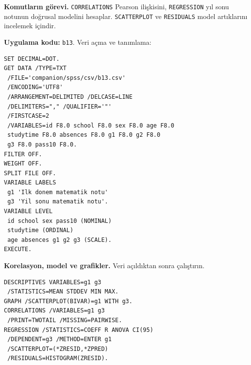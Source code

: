 {\raggedright
\noindent\textbf{Komutların görevi.} \texttt{CORRELATIONS} Pearson ilişkisini, \texttt{REGRESSION} yıl sonu notunun doğrusal modelini hesaplar. \texttt{SCATTERPLOT} ve \texttt{RESIDUALS} model artıklarını incelemek içindir.\par}

\par\noindent\begin{minipage}{\linewidth}
\textbf{Uygulama kodu:} \texttt{b13}. Veri açma ve tanımlama:

\begin{lstlisting}[style=prismSPSS]
SET DECIMAL=DOT.
GET DATA /TYPE=TXT
 /FILE='companion/spss/csv/b13.csv'
 /ENCODING='UTF8'
 /ARRANGEMENT=DELIMITED /DELCASE=LINE
 /DELIMITERS="," /QUALIFIER='"'
 /FIRSTCASE=2
 /VARIABLES=id F8.0 school F8.0 sex F8.0 age F8.0
 studytime F8.0 absences F8.0 g1 F8.0 g2 F8.0
 g3 F8.0 pass10 F8.0.
FILTER OFF.
WEIGHT OFF.
SPLIT FILE OFF.
VARIABLE LABELS
 g1 'Ilk donem matematik notu'
 g3 'Yil sonu matematik notu'.
VARIABLE LEVEL
 id school sex pass10 (NOMINAL)
 studytime (ORDINAL)
 age absences g1 g2 g3 (SCALE).
EXECUTE.
\end{lstlisting}
\end{minipage}\par

\par\noindent\begin{minipage}{\linewidth}
\textbf{Korelasyon, model ve grafikler.} Veri açıldıktan sonra çalıştırın.

\begin{lstlisting}[style=prismSPSS]
DESCRIPTIVES VARIABLES=g1 g3
 /STATISTICS=MEAN STDDEV MIN MAX.
GRAPH /SCATTERPLOT(BIVAR)=g1 WITH g3.
CORRELATIONS /VARIABLES=g1 g3
 /PRINT=TWOTAIL /MISSING=PAIRWISE.
REGRESSION /STATISTICS=COEFF R ANOVA CI(95)
 /DEPENDENT=g3 /METHOD=ENTER g1
 /SCATTERPLOT=(*ZRESID,*ZPRED)
 /RESIDUALS=HISTOGRAM(ZRESID).
\end{lstlisting}

\end{minipage}\par

